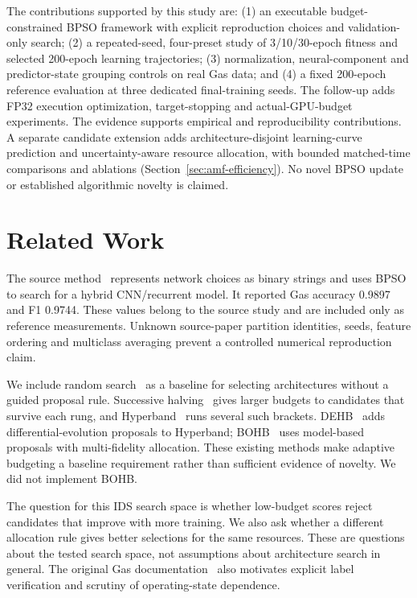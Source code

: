 The contributions supported by this study are: (1) an executable budget-constrained BPSO framework with explicit reproduction choices and validation-only search; (2) a repeated-seed, four-preset study of 3/10/30-epoch fitness and selected 200-epoch learning trajectories; (3) normalization, neural-component and predictor-state grouping controls on real Gas data; and (4) a fixed 200-epoch reference evaluation at three dedicated final-training seeds. The follow-up adds FP32 execution optimization, target-stopping and actual-GPU-budget experiments. The evidence supports empirical and reproducibility contributions. A separate candidate extension adds architecture-disjoint learning-curve prediction and uncertainty-aware resource allocation, with bounded matched-time comparisons and ablations (Section~\ref{sec:amf-efficiency}). No novel BPSO update or established algorithmic novelty is claimed.

\section{Related Work}
The source method~\cite{lu2025} represents network choices as binary strings and uses BPSO to search for a hybrid CNN/recurrent model. It reported Gas accuracy 0.9897 and F1 0.9744. These values belong to the source study and are included only as reference measurements. Unknown source-paper partition identities, seeds, feature ordering and multiclass averaging prevent a controlled numerical reproduction claim.

We include random search~\cite{bergstra2012} as a baseline for selecting architectures without a guided proposal rule. Successive halving~\cite{jamieson2016} gives larger budgets to candidates that survive each rung, and Hyperband~\cite{li2018} runs several such brackets. DEHB~\cite{awad2021} adds differential-evolution proposals to Hyperband; BOHB~\cite{falkner2018} uses model-based proposals with multi-fidelity allocation. These existing methods make adaptive budgeting a baseline requirement rather than sufficient evidence of novelty. We did not implement BOHB.

The question for this IDS search space is whether low-budget scores reject candidates that improve with more training. We also ask whether a different allocation rule gives better selections for the same resources. These are questions about the tested search space, not assumptions about architecture search in general. The original Gas documentation~\cite{morris2014,hsu2014} also motivates explicit label verification and scrutiny of operating-state dependence.

